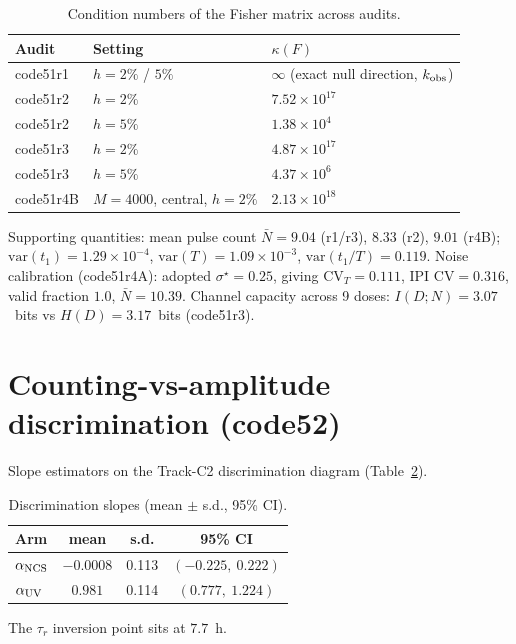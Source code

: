 \documentclass[11pt]{article}
\begin{document}
\begin{table}[h]
\centering\small
\caption{Condition numbers of the Fisher matrix across audits.}
\label{tab:cond}
\begin{tabular}{lll}
\toprule
Audit & Setting & $\kappa(F)$ \\
\midrule
code51r1 & $h{=}2\%$ / $5\%$ & $\infty$ (exact null direction, $k_{\rm obs}$) \\
code51r2 & $h{=}2\%$ & $7.52\times10^{17}$ \\
code51r2 & $h{=}5\%$ & $1.38\times10^{4}$ \\
code51r3 & $h{=}2\%$ & $4.87\times10^{17}$ \\
code51r3 & $h{=}5\%$ & $4.37\times10^{6}$ \\
code51r4B & $M{=}4000$, central, $h{=}2\%$ & $2.13\times10^{18}$ \\
\bottomrule
\end{tabular}
\end{table}

Supporting quantities: mean pulse count $\bar N = 9.04$ (r1/r3), $8.33$
(r2), $9.01$ (r4B); $\mathrm{var}(t_1)=1.29\times10^{-4}$,
$\mathrm{var}(T)=1.09\times10^{-3}$, $\mathrm{var}(t_1/T)=0.119$.
Noise calibration (code51r4A): adopted $\sigma^\star=0.25$, giving
$\mathrm{CV}_T=0.111$, IPI $\mathrm{CV}=0.316$, valid fraction $1.0$,
$\bar N=10.39$. Channel capacity across 9 doses:
$I(D;N)=3.07$~bits vs $H(D)=3.17$~bits (code51r3).

\section{Counting-vs-amplitude discrimination (code52)}

Slope estimators on the Track-C2 discrimination diagram
(Table~\ref{tab:trackc2}).

\begin{table}[h]
\centering\small
\caption{Discrimination slopes (mean $\pm$ s.d., 95\% CI).}
\label{tab:trackc2}
\begin{tabular}{lccc}
\toprule
Arm & mean & s.d. & 95\% CI \\
\midrule
$\alpha_{\rm NCS}$ & $-0.0008$ & 0.113 & $(-0.225,\ 0.222)$ \\
$\alpha_{\rm UV}$ & $0.981$ & 0.114 & $(0.777,\ 1.224)$ \\
\bottomrule
\end{tabular}
\end{table}

The $\tau_r$ inversion point sits at $7.7$~h.
\end{document}
